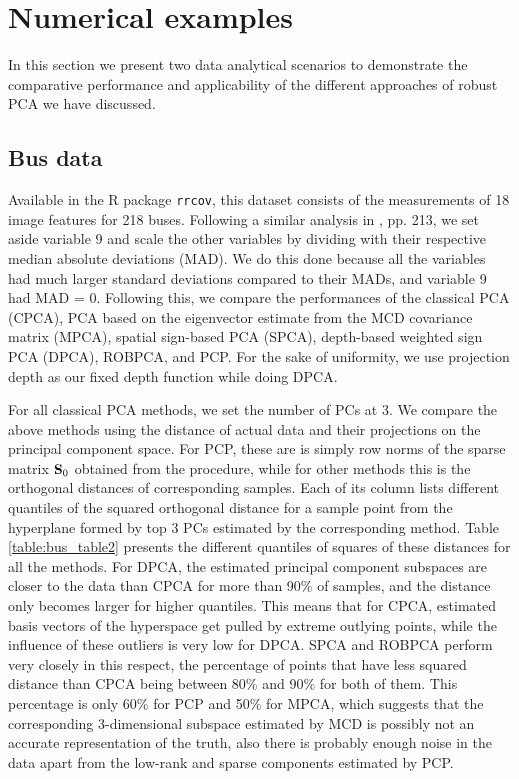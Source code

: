 \section{Numerical examples}
\label{section:sec4}

In this section we present two data analytical scenarios to demonstrate the comparative performance and applicability of the different approaches of robust PCA we have discussed.

\subsection{Bus data}
Available in the R package \texttt{rrcov}, this dataset consists of the measurements of 18 image features for 218 buses. Following a similar analysis in \cite{maronna06}, pp. 213, we set aside variable 9 and scale the other variables by dividing with their respective median absolute deviations (MAD). We do this done because all the variables had much larger standard deviations compared to their MADs, and variable 9 had MAD = 0. Following this, we compare the performances of the classical PCA (CPCA), PCA based on the eigenvector estimate from the MCD covariance matrix (MPCA), spatial sign-based PCA (SPCA), depth-based weighted sign PCA (DPCA), ROBPCA, and PCP.
For the sake of uniformity, we use projection depth as our fixed depth function while doing DPCA.

For all classical PCA methods, we set the number of PCs at 3. We compare the above methods using the distance of actual data and their projections on the principal component space. For PCP, these are is simply row norms of the sparse matrix ${\mathbf{S}}_0$ obtained from the procedure, while for other methods this is the orthogonal distances of corresponding samples. Each of its column lists different quantiles of the squared orthogonal distance for a sample point from the hyperplane formed by top 3 PCs estimated by the corresponding method. Table \ref{table:bus_table2} presents the different quantiles of squares of these distances for all the methods. For DPCA, the estimated principal component subspaces are closer to the data than CPCA for more than 90\% of samples, and the distance only becomes larger for higher quantiles. This means that for CPCA, estimated basis vectors of the hyperspace get pulled by extreme outlying points, while the influence of these outliers is very low for DPCA. SPCA and ROBPCA perform very closely in this respect, the percentage of points that have less squared distance than CPCA being between 80\% and 90\% for both of them. This percentage is only 60\% for PCP and 50\% for MPCA, which suggests that the corresponding 3-dimensional subspace estimated by MCD is possibly not an accurate representation of the truth, also there is probably enough noise in the data apart from the low-rank and sparse components estimated by PCP.

